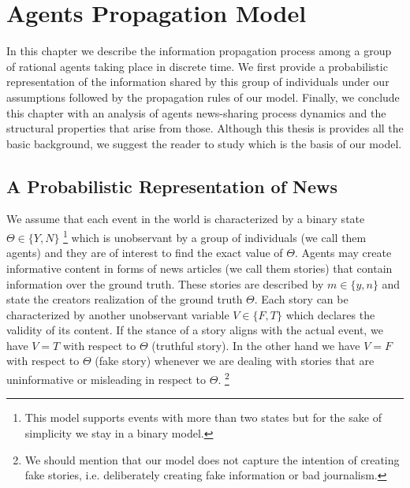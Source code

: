 

\chapter{Agents Propagation Model}
\label{ch:Agents Propagation Model}

In this chapter we describe the information propagation process among a group of rational agents taking place in discrete time. We first provide a probabilistic representation of the information shared by this group of individuals under our assumptions followed by the propagation rules of our model. Finally, we conclude this chapter with an analysis of agents news-sharing process dynamics and the structural properties that arise from those. Although this thesis is provides all the basic background, we suggest the reader to study \cite{papanastasiou} which is the basis of our model.


\section{A Probabilistic Representation of News}
\label{sec:FKNews param}
We assume that each event in the world is characterized by a binary state $\Theta \in \{Y,N\}$ \footnote{This model supports events with more than two states but for the sake of simplicity we stay in a binary model.} which is unobservant by a group of individuals (we call them agents) and they are of interest to find the exact value of $\Theta$. Agents may create informative content in forms of news articles (we call them stories) that contain information over the ground truth. These stories are described by $m \in \{y,n\}$ and state the creators realization of the ground truth $\Theta$. Each story can be characterized by another unobservant variable $V \in \{F,T\}$ which declares the validity of its content. If the stance of a story aligns with the actual event, we have $V=T$ with respect to $\Theta$ (truthful story). In the other hand we have $V=F$ with respect to $\Theta$ (fake story) whenever we are dealing with stories that are uninformative or misleading in respect to $\Theta$. \footnote{We should mention that our model does not capture the intention of creating fake stories, i.e. deliberately creating fake information or bad journalism.} 

